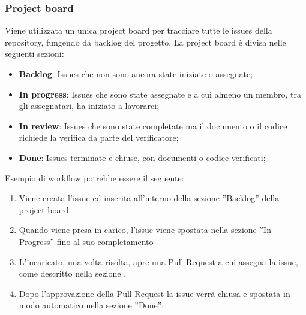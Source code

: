         \subsubsection{Project board}
        Viene utilizzata un unica project board per tracciare tutte le issues della repository, fungendo da backlog del progetto.
        La project board è divisa nelle seguenti sezioni:
        \begin{itemize}
            \item \textbf{Backlog}: Issues che non sono ancora state iniziate o assegnate;
            \item \textbf{In progress}: Issues che sono state assegnate e a cui almeno un membro, tra gli assegnatari, ha iniziato a lavorarci;
            \item \textbf{In review}: Issues che sono state completate ma il documento o il codice richiede la verifica da parte del verificatore;
            \item \textbf{Done}: Issues terminate e chiuse, con documenti o codice verificati;
        \end{itemize}
        Esempio di workflow potrebbe essere il seguente:
        \begin{enumerate}
            \item Viene creata l'issue ed inserita all'interno della sezione ”Backlog” della project board
            \item Quando viene presa in carico, l'issue viene spostata nella sezione ”In Progress” fino al suo completamento
            \item L'incaricato, una volta risolta, apre una Pull Request a cui assegna la issue, come descritto nella sezione .
            \item Dopo l'approvazione della Pull Request la issue verrà chiusa e spostata in modo automatico nella sezione ”Done”;
        \end{enumerate}


